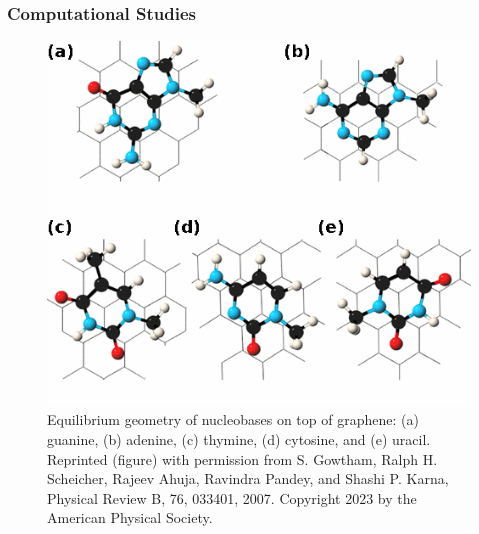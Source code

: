 \subsubsection{Computational Studies}
\begin{figure}
    \centering
    \includegraphics{Introduction/Figures/Figure2.png}
    \caption[Equilibrium geometry of nucleobases on top of graphene: (a) guanine, (b) adenine, (c) thymine, (d) cytosine, and (e) uracil from ab-initio calculations]{Equilibrium geometry of nucleobases on top of graphene: (a) guanine, (b) adenine, (c) thymine, (d) cytosine, and (e) uracil. Reprinted (figure) with permission from S. Gowtham, Ralph H. Scheicher, Rajeev Ahuja, Ravindra Pandey, and Shashi P. Karna, Physical Review B, 76, 033401, 2007.\supercite{gowtham_physisorption_2007} Copyright 2023 by the American Physical Society.}
    \label{fig:enter-label}
\end{figure}

